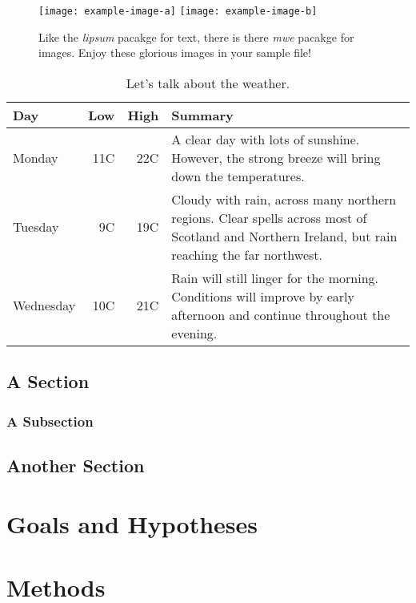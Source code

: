 \documentclass[twoside]{mtu.thesis}
\begin{document}
\begin{figure}[t]
\centering
\texttt{[image: example-image-a]}\hfill
\texttt{[image: example-image-b]}
\caption[The \emph{mwe} pacakge is pretty great!]{Like the \emph{lipsum} pacakge for text, there is there \emph{mwe} pacakge for images. Enjoy these glorious images in your sample file!}
\end{figure}

\lipsum[4-6]

\begin{table}
\caption{Let's talk about the weather.}
\centering
\begin{tabular}{lrrp{10cm}}
\hline
Day & Low & High & Summary \\\hline
Monday & 11C & 22C & A clear day with lots of sunshine. However, the strong breeze will bring down the temperatures. \\
Tuesday & 9C & 19C & Cloudy with rain, across many northern regions. Clear spells across most of Scotland and Northern Ireland, but rain reaching the far northwest. \\
Wednesday & 10C & 21C & Rain will still linger for the morning. Conditions will improve by early afternoon and continue throughout the evening. \\\hline
\end{tabular}
\end{table}

\lipsum[7-10]

\section{A Section}
\lipsum[10-12]

\subsection{A Subsection}
\lipsum[13]

\section{Another Section}
\lipsum[14-20]

\chapter{Goals and Hypotheses}
\lipsum[1-18]

\chapter{Methods}
\lipsum[1-20]
\end{document}
